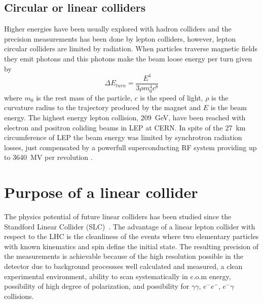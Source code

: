 \subsection{Circular or linear colliders}
Higher energies have been usually explored with hadron colliders and the precision measurements has been done by lepton colliders, however, lepton circular colliders are limited by radiation. When particles traverse magnetic fields they emit photons and this photons make the beam loose energy per turn given by
\begin{equation}
 \Delta E_{turn}=\frac{E^4}{3\rho m_0^4c^8}
\end{equation}
where $m_0$ is the rest mass of the particle, $c$ is the speed of light, $\rho$ is the curvature radius to the trajectory produced by the magnet and $E$ is the beam energy. The highest energy lepton collision, 209~GeV, have been reached with electron and positron coliding beams in LEP at CERN.  In spite of the 27~km circumference of LEP the beam energy was limited by synchrotron radiation losses, just compensated by a powerfull superconducting RF system providing up to 3640~MV per revolution \cite{Assmann:549223}.\par
\section{Purpose of a linear collider}
The physics potential of future linear colliders has been studied since the Standford Linear Collider (SLC)~\cite{Feldman88,SLC91}. The advantage of a linear lepton collider with respect to the LHC is the cleanliness of the events where two elementary particles with known kinematics and spin define the initial state. The resulting precision of the measurements is achievable because of the high resolution possible in the detector due to background processses well calculated and measured, a clean experimental environment, ability to scan systematically in c.o.m energy, possibility of high degree of polarization, and possibility for $\gamma\gamma$, $e^-e^-$, $e^-\gamma$ collisions.\par
